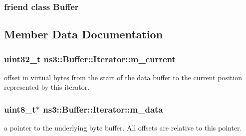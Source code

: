 \subsubsection[{\texorpdfstring{Buffer}{Buffer}}]{\setlength{\rightskip}{0pt plus 5cm}friend class {\bf Buffer}\hspace{0.3cm}{\ttfamily [friend]}}\hypertarget{classns3_1_1Buffer_1_1Iterator_a5ba04a2bf0ca34a0f845cd759950664d}{}\label{classns3_1_1Buffer_1_1Iterator_a5ba04a2bf0ca34a0f845cd759950664d}


\subsection{Member Data Documentation}
\subsubsection[{\texorpdfstring{m\+\_\+current}{m_current}}]{\setlength{\rightskip}{0pt plus 5cm}uint32\+\_\+t ns3\+::\+Buffer\+::\+Iterator\+::m\+\_\+current\hspace{0.3cm}{\ttfamily [private]}}\hypertarget{classns3_1_1Buffer_1_1Iterator_a762e0242d60f4d717158d0584e4accd6}{}\label{classns3_1_1Buffer_1_1Iterator_a762e0242d60f4d717158d0584e4accd6}
offset in virtual bytes from the start of the data buffer to the current position represented by this iterator. 
\subsubsection[{\texorpdfstring{m\+\_\+data}{m_data}}]{\setlength{\rightskip}{0pt plus 5cm}uint8\+\_\+t$\ast$ ns3\+::\+Buffer\+::\+Iterator\+::m\+\_\+data\hspace{0.3cm}{\ttfamily [private]}}\hypertarget{classns3_1_1Buffer_1_1Iterator_a406cd27bb4983e8ba23542eadbc9330b}{}\label{classns3_1_1Buffer_1_1Iterator_a406cd27bb4983e8ba23542eadbc9330b}
a pointer to the underlying byte buffer. All offsets are relative to this pointer. 
